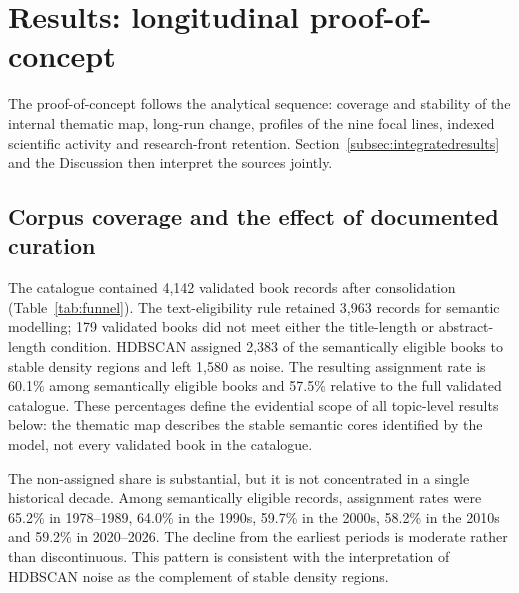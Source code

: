\documentclass[futureinternet,article,submit,moreauthors]{Definitions/mdpi}
\begin{document}
\section{Results: longitudinal proof-of-concept}\label{sec:results}

The proof-of-concept follows the analytical sequence: coverage and stability of the internal thematic map, long-run change, profiles of the nine focal lines, indexed scientific activity and research-front retention. Section~\ref{subsec:integratedresults} and the Discussion then interpret the sources jointly.

\subsection{Corpus coverage and the effect of documented curation}\label{subsec:funnel}

The catalogue contained 4,142 validated book records after consolidation (Table~\ref{tab:funnel}). The text-eligibility rule retained 3,963 records for semantic modelling; 179 validated books did not meet either the title-length or abstract-length condition. HDBSCAN assigned 2,383 of the semantically eligible books to stable density regions and left 1,580 as noise. The resulting assignment rate is 60.1\% among semantically eligible books and 57.5\% relative to the full validated catalogue. These percentages define the evidential scope of all topic-level results below: the thematic map describes the stable semantic cores identified by the model, not every validated book in the catalogue.

The non-assigned share is substantial, but it is not concentrated in a single historical decade. Among semantically eligible records, assignment rates were 65.2\% in 1978--1989, 64.0\% in the 1990s, 59.7\% in the 2000s, 58.2\% in the 2010s and 59.2\% in 2020--2026. The decline from the earliest periods is moderate rather than discontinuous. This pattern is consistent with the interpretation of HDBSCAN noise as the complement of stable density regions.
\end{document}
